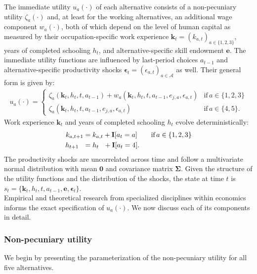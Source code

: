 \noindent The immediate utility $u_a(\cdot)$ of each alternative consists of a non-pecuniary utility $\zeta_a(\cdot)$ and, at least for the working alternatives, an additional wage component $w_a(\cdot)$, both of which depend on the level of human capital as measured by their occupation-specific work experience $\bm{k}_t = \left(k_{a,t}\right)_{a\in\{1, 2, 3\}}$, years of completed schooling $h_t$, and alternative-specific skill endowment $\bm{e}$. The immediate utility functions are influenced by last-period choices $a_{t -1}$ and alternative-specific productivity shocks $\bm{\epsilon}_t = \left(\epsilon_{a,t}\right)_{a\in\mathcal{A}}$ as well. Their general form is given by:
%
\begin{align*}
u_a(\cdot) =
\begin{cases}
    \zeta_a(\bm{k}_t, h_t, t, a_{t -1})  + w_a(\bm{k}_t, h_t, t, a_{t -1}, e_{j, a}, \epsilon_{a,t})                & \text{if}\, a \in \{1, 2, 3\}  \\
    \zeta_a(\bm{k}_t, h_t, t, a_{t-1}, e_{j,a}, \epsilon_{a,t})                                                  &  \text{if}\, a \in \{4, 5\}.
\end{cases}
\end{align*}
%
Work experience $\bm{k}_t$  and years of completed schooling $h_t$ evolve deterministically:
%
\begin{align*}
	k_{a,t+1} & = k_{a,t} + {\textbf{I}}[a_t = a]  \qquad \text{if}\, a \in \{1, 2, 3\} \\
	h_{t + 1\phantom{,a}} & = h_{t\phantom{,a}} +   {\textbf{I}}[a_t = 4].
\end{align*}
%
\noindent The productivity shocks are uncorrelated across time and follow a multivariate normal distribution with mean $\bm{0}$ and covariance matrix $\bm{\Sigma}$. Given the structure of the utility functions and the distribution of the shocks, the state at time $t$ is $s_t = \{\bm{k}_t, h_t, t, a_{t -1}, \bm{e},\bm{\epsilon}_t\}$.\\

\noindent Empirical and theoretical research from specialized disciplines within economics informs the exact specification of $u_a(\cdot)$. We now discuss each of its components in detail.
\subsubsection*{Non-pecuniary utility}
We begin by presenting the parameterization of the non-pecuniary utility for all five alternatives.
